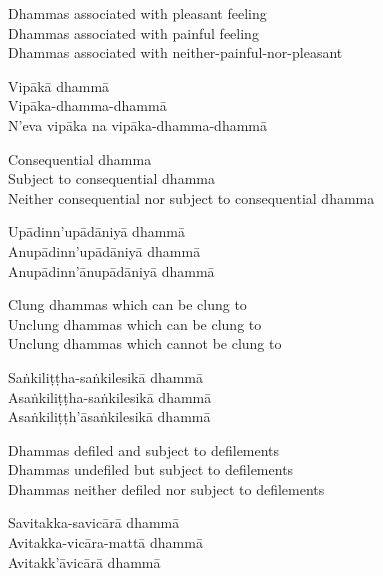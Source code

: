 \begin{english-verses}
  Dhammas associated with pleasant feeling\\
  Dhammas associated with painful feeling\\
  Dhammas associated with neither-painful-nor-pleasant
\end{english-verses}

\begin{pali-hang-continued}
  Vipākā dhammā\\
  Vipāka-dhamma-dhammā\\
  N'eva vipāka na vipāka-dhamma-dhammā
\end{pali-hang-continued}

\begin{english-verses}
  Consequential dhamma\\
  Subject to consequential dhamma\\
  Neither consequential nor subject to consequential dhamma
\end{english-verses}

\begin{pali-hang-continued}
  Upādinn'upādāniyā dhammā\\
  Anupādinn'upādāniyā dhammā\\
  Anupādinn'ānupādāniyā dhammā
\end{pali-hang-continued}

\begin{english-verses}
  Clung dhammas which can be clung to\\
  Unclung dhammas which can be clung to\\
  Unclung dhammas which cannot be clung to
\end{english-verses}

\begin{pali-hang-continued}
  Saṅkiliṭṭha-saṅkilesikā dhammā\\
  Asaṅkiliṭṭha-saṅkilesikā dhammā\\
  Asaṅkiliṭṭh'āsaṅkilesikā dhammā
\end{pali-hang-continued}

\begin{english-verses}
  Dhammas defiled and subject to defilements\\
  Dhammas undefiled but subject to defilements\\
  Dhammas neither defiled nor subject to defilements
\end{english-verses}

\begin{pali-hang-continued}
  Savitakka-savicārā dhammā\\
  Avitakka-vicāra-mattā dhammā\\
  Avitakk'āvicārā dhammā
\end{pali-hang-continued}

